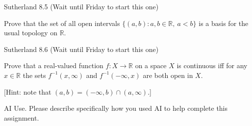 \documentclass[minion]{homework}
\newcommand{\Reals}{\ensuremath{\mathbb R}}%
\begin{document}
\begin{problems}
\problem Sutherland 8.5 (Wait until Friday to start this one)

Prove that the set of all open intervals $\{(a, b) : a, b \in \Reals,\ a < b\}$ is a basis for the usual topology on $\Reals$.

\problem Sutherland 8.6 (Wait until Friday to start this one)

Prove that a real-valued function $f : X \to \Reals$ on a space $X$ is continuous iff for any $x \in \Reals$ the sets $f^{-1}(x, \infty)$ and $f^{-1}(-\infty, x)$ are both open in $X$.

[Hint: note that $(a, b) = (-\infty, b) \cap (a, \infty)$.]

\problem AI Use. Please describe specifically how you used AI to help complete this assignment.

\end{problems}
\end{document}
